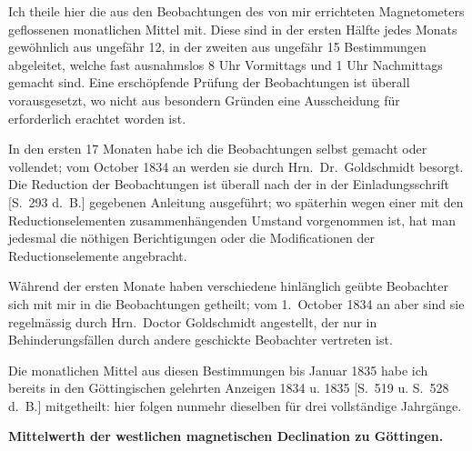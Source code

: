 \documentclass[12pt,a4paper]{article}
\begin{document}
\smallskip
\noindent
Ich theile hier die aus den Beobachtungen des von mir errichteten Magnetometers geflossenen monatlichen Mittel mit. Diese sind in der ersten H\"alfte jedes Monats gew\"ohnlich aus ungef\"ahr 12, in der zweiten aus ungef\"ahr 15 Bestimmungen abgeleitet, welche fast ausnahmslos 8 Uhr Vormittags und 1 Uhr Nachmittags gemacht sind. Eine ersch\"opfende Pr\"ufung der Beobachtungen ist \"uberall vorausgesetzt, wo nicht aus besondern Gr\"unden eine Ausscheidung f\"ur erforderlich erachtet worden ist.

In den ersten 17 Monaten habe ich die Beobachtungen selbst gemacht oder vollendet; vom October 1834 an werden sie durch Hrn.~Dr.~Goldschmidt besorgt. Die Reduction der Beobachtungen ist \"uberall nach der in der Einladungsschrift [S.~293 d.~B.] gegebenen Anleitung ausgef\"uhrt; wo sp\"aterhin wegen einer mit den Reductionselementen zusammenh\"angenden Umstand vorgenommen ist, hat man jedesmal die n\"othigen Berichtigungen oder die Modificationen der Reductionselemente angebracht.

\newpage
\noindent
W\"ahrend der ersten Monate haben verschiedene hinl\"anglich ge\"ubte Beobachter sich mit mir in die Beobachtungen getheilt; vom 1.~October 1834 an aber sind sie regelm\"assig durch Hrn.~Doctor Goldschmidt angestellt, der nur in Behinderungsf\"allen durch andere geschickte Beobachter vertreten ist.

Die monatlichen Mittel aus diesen Bestimmungen bis Januar 1835 habe ich bereits in den G\"ottingischen gelehrten Anzeigen 1834 u. 1835 [S.~519 u. S.~528 d.~B.] mitgetheilt: hier folgen nunmehr dieselben f\"ur drei vollst\"andige Jahrg\"ange.

\begin{center}
\textbf{Mittelwerth der westlichen magnetischen Declination zu G\"ottingen.}
\end{center}
\end{document}
